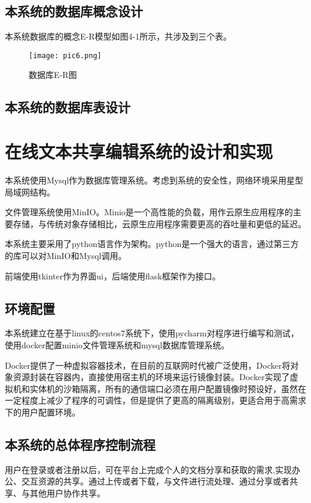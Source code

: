 \documentclass[forprint]{software}
\begin{document}
\section{本系统的数据库概念设计}

本系统数据库的概念E-R模型如图4-1所示，共涉及到三个表。

\begin{figure}[!htbp]
	\centering
	\texttt{[image: pic6.png]}
	\caption{数据库E-R图}
	\label{fig:1}
\end{figure}

\section{本系统的数据库表设计}

\chapter{在线文本共享编辑系统的设计和实现}

本系统使用Mysql作为数据库管理系统。考虑到系统的安全性，网络环境采用星型局域网结构。

文件管理系统使用MinIO。Minio是一个高性能的负载，用作云原生应用程序的主要存储，与传统对象存储相比，云原生应用程序需要更高的吞吐量和更低的延迟。

本系统主要采用了python语言作为架构。python是一个强大的语言，通过第三方的库可以对MinIO和Mysql调用。

前端使用tkinter作为界面ui，后端使用flask框架作为接口。

\section{环境配置}

本系统建立在基于linux的centos7系统下，使用pycharm对程序进行编写和测试，使用docker配置minio文件管理系统和mysql数据库管理系统。

Docker提供了一种虚拟容器技术，在目前的互联网时代被广泛使用，Docker将对象资源封装在容器内，直接使用宿主机的环境来运行镜像封装。Docker实现了虚拟机和实体机的沙箱隔离，所有的通信端口必须在用户配置镜像时预设好，虽然在一定程度上减少了程序的可调性，但是提供了更高的隔离级别，更适合用于高需求下的用户配置环境。

\section{本系统的总体程序控制流程}

用户在登录或者注册以后，可在平台上完成个人的文档分享和获取的需求,实现办公、交互资源的共享。通过上传或者下载，与文件进行流处理、通过分享或者共享、与其他用户协作共享。
\end{document}
